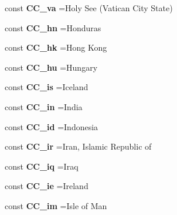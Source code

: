 \begin{DoxyCompactItemize}
const {\bfseries C\+C\+\_\+va} =\textquotesingle{}Holy See (Vatican City State)\textquotesingle{}
\item 
\hypertarget{class_i_s_o_ad61590648a92cbc5fb51ac74307fe27b}{}\label{class_i_s_o_ad61590648a92cbc5fb51ac74307fe27b} 
const {\bfseries C\+C\+\_\+hn} =\textquotesingle{}Honduras\textquotesingle{}
\item 
\hypertarget{class_i_s_o_a4bc0e3894dc064ee30619695d8c931b5}{}\label{class_i_s_o_a4bc0e3894dc064ee30619695d8c931b5} 
const {\bfseries C\+C\+\_\+hk} =\textquotesingle{}Hong Kong\textquotesingle{}
\item 
\hypertarget{class_i_s_o_a1ea2dcd0bb365132b922143e0286c383}{}\label{class_i_s_o_a1ea2dcd0bb365132b922143e0286c383} 
const {\bfseries C\+C\+\_\+hu} =\textquotesingle{}Hungary\textquotesingle{}
\item 
\hypertarget{class_i_s_o_a2e05518fd2bd998ff6e31f6a72c174fd}{}\label{class_i_s_o_a2e05518fd2bd998ff6e31f6a72c174fd} 
const {\bfseries C\+C\+\_\+is} =\textquotesingle{}Iceland\textquotesingle{}
\item 
\hypertarget{class_i_s_o_a6d25d18bcedc15d9eb82b4edc5be0546}{}\label{class_i_s_o_a6d25d18bcedc15d9eb82b4edc5be0546} 
const {\bfseries C\+C\+\_\+in} =\textquotesingle{}India\textquotesingle{}
\item 
\hypertarget{class_i_s_o_a3827e88b45988ea20904b5fcba5032d5}{}\label{class_i_s_o_a3827e88b45988ea20904b5fcba5032d5} 
const {\bfseries C\+C\+\_\+id} =\textquotesingle{}Indonesia\textquotesingle{}
\item 
\hypertarget{class_i_s_o_a8c0a564c7ef51a70d1664fee11b09886}{}\label{class_i_s_o_a8c0a564c7ef51a70d1664fee11b09886} 
const {\bfseries C\+C\+\_\+ir} =\textquotesingle{}Iran, Islamic Republic of\textquotesingle{}
\item 
\hypertarget{class_i_s_o_abcb847e31b5e89178615e8a00d2c20f2}{}\label{class_i_s_o_abcb847e31b5e89178615e8a00d2c20f2} 
const {\bfseries C\+C\+\_\+iq} =\textquotesingle{}Iraq\textquotesingle{}
\item 
\hypertarget{class_i_s_o_a1df2d6e777492a98e3ea0a1ac811c399}{}\label{class_i_s_o_a1df2d6e777492a98e3ea0a1ac811c399} 
const {\bfseries C\+C\+\_\+ie} =\textquotesingle{}Ireland\textquotesingle{}
\item 
\hypertarget{class_i_s_o_a7f634a87e23c777259c60d37d2e78099}{}\label{class_i_s_o_a7f634a87e23c777259c60d37d2e78099} 
const {\bfseries C\+C\+\_\+im} =\textquotesingle{}Isle of Man\textquotesingle{}
\item 
\hypertarget{class_i_s_o_a550e0717cce9f0046e8a7deb93cac97a}{}\label{class_i_s_o_a550e0717cce9f0046e8a7deb93cac97a} 

\end{DoxyCompactItemize}

